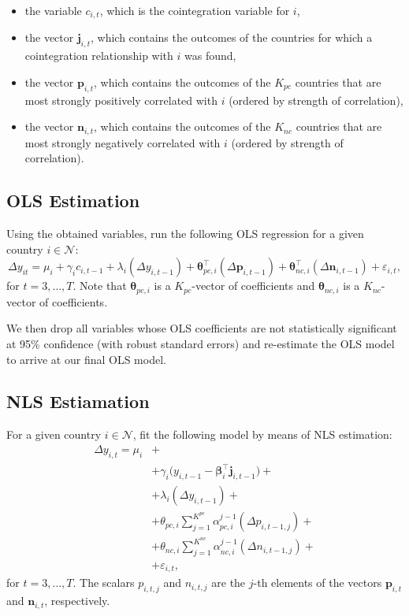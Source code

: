 \documentclass{article}
\begin{document}
\begin{itemize}
    \item the variable $c_{i,t}$, which is the cointegration variable for $i$,
    \item the vector $\mathbf{j}_{i,t}$, which contains the outcomes of the countries for which a cointegration relationship with $i$ was found,
    \item the vector $\mathbf{p}_{i,t}$, which contains the outcomes of the $K_{pc}$ countries that are most strongly positively correlated with $i$ (ordered by strength of correlation),
    \item the vector $\mathbf{n}_{i,t}$, which contains the outcomes of the $K_{nc}$ countries that are most strongly negatively correlated with $i$ (ordered by strength of correlation).
\end{itemize}

\subsection{OLS Estimation} \label{sec:ols}
Using the obtained variables, run the following OLS regression for a given country $i \in \mathcal{N}$:
 \begin{equation}
     \Delta y_{it} 
     =
     \mu_i +
     \gamma_i  c_{i,t-1} +
     \lambda_i (\Delta y_{i, t-1}) +
     \bm{\theta}_{pc,i}^\top (\Delta \mathbf{p}_{i,t-1}) +
     \bm{\theta}_{nc,i}^\top (\Delta \mathbf{n}_{i,t-1}) +
     \varepsilon_{i,t}, 
     \label{eq:ols}
 \end{equation}
for $t=3,\dots,T$. Note that $\bm{\theta}_{pc,i}$ is a $K_{pc}$-vector of coefficients and $\bm{\theta}_{nc,i}$ is a $K_{nc}$-vector of coefficients.

We then drop all variables whose OLS coefficients are not statistically significant at 95\% confidence (with robust standard errors) and re-estimate the OLS model to arrive at our final OLS model.

\subsection{NLS Estiamation} \label{sec:nls}
For a given country $i \in \mathcal{N}$, fit the following model by means of NLS estimation:
 \begin{equation}
 \begin{split}
     \Delta y_{i,t}
     =
     \mu_i &+ \\
     &+ \gamma_i \Big( y_{i,t-1} - \bm{\beta}_i^\top \mathbf{j}_{i,t-1}  \Big) + \\
     &+ \lambda_i (\Delta y_{i, t-1}) + \\
     &+ \theta_{pc,i} \sum_{j=1}^{K^{pc}} \alpha_{pc,i}^{j-1} (\Delta p_{i,t-1,j}) + \\
     &+ \theta_{nc,i} \sum_{j=1}^{K^{nc}} \alpha_{nc,i}^{j-1} (\Delta n_{i,t-1,j}) + \\
     &+ \varepsilon_{i,t},
     \label{eq:nls}
 \end{split}
 \end{equation}
for $t=3,\dots,T$. The scalars $p_{i,t,j}$ and $n_{i,t,j}$ are the $j$-th elements of the vectors $\mathbf{p}_{i,t}$ and $\mathbf{n}_{i,t}$, respectively.
\end{document}
